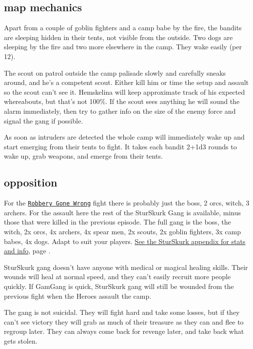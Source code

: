 \subsection*{map mechanics}

Apart from a couple of goblin fighters and a camp babe by the fire, the bandits are sleeping hidden in their tents, not visible from the outside. Two dogs are sleeping by the fire and two more elsewhere in the camp. They wake easily (per 12).

The scout on patrol outside the camp palisade slowly and carefully sneaks around, and he's a competent scout. Either kill him or time the setup and assault so the scout can't see it. Hemskelina will keep approximate track of his expected whereabouts, but that's not 100\%. If the scout sees anything he will sound the alarm immediately, then try to gather info on the size of the enemy force and signal the gang if possible.

As soon as intruders are detected the whole camp will immediately wake up and start emerging from their tents to fight. It takes each bandit 2+1d3 rounds to wake up, grab weapons, and emerge from their tents.


\subsection*{opposition}

For the \hyperref[01robberygonewrong]{\texttt{Robbery Gone Wrong}} fight there is probably just the boss, 2 orcs, witch, 3 archers. For the assault here the rest of the SturSkurk Gang is available, minus those that were killed in the previous episode. The full gang is the boss, the witch, 2x orcs, 4x archers, 4x spear men, 2x scouts, 2x goblin fighters, 3x camp babes, 4x dogs. Adapt to suit your players. 
\hyperref[appendixsturskurk]{See the SturSkurk appendix for stats and info}, page \pageref{appendixsturskurk}.

SturSkurk gang doesn't have anyone with medical or magical healing skills. Their wounds will heal at normal speed, and they can't easily recruit more people quickly. If GamGang is quick, SturSkurk gang will still be wounded from the previous fight when the Heroes assault the camp. 

The gang is not suicidal. They will fight hard and take some losses, but if they can't see victory they will grab as much of their treasure as they can and flee to regroup later. They can always come back for revenge later, and take back what gets stolen.


